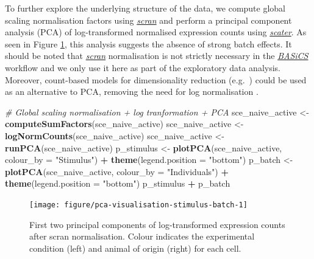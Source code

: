 \documentclass[9pt,a4paper,]{extarticle}
\newenvironment{Shaded}{\begin{snugshade}}{\end{snugshade}}
\newcommand{\CommentTok}[1]{\textcolor[rgb]{0.56,0.35,0.01}{\textit{#1}}}
\newcommand{\DataTypeTok}[1]{\textcolor[rgb]{0.13,0.29,0.53}{#1}}
\newcommand{\KeywordTok}[1]{\textcolor[rgb]{0.13,0.29,0.53}{\textbf{#1}}}
\newcommand{\NormalTok}[1]{#1}
\newcommand{\OperatorTok}[1]{\textcolor[rgb]{0.81,0.36,0.00}{\textbf{#1}}}
\newcommand{\StringTok}[1]{\textcolor[rgb]{0.31,0.60,0.02}{#1}}
\begin{document}
To further explore the underlying structure of the data, we compute global
scaling normalisation factors using \emph{\href{https://bioconductor.org/packages/3.11/scran}{scran}} and perform a
principal component analysis (PCA) of log-transformed normalised expression
counts using \emph{\href{https://bioconductor.org/packages/3.11/scater}{scater}}.
As seen in Figure \ref{fig:pca-visualisation-stimulus-batch}, this analysis
suggests the absence of strong batch effects.
It should be noted that \emph{\href{https://bioconductor.org/packages/3.11/scran}{scran}} normalisation
is not strictly necessary in the \emph{\href{https://bioconductor.org/packages/3.11/BASiCS}{BASiCS}} workflow and we only
use it here as part of the exploratory data analysis.
Moreover, count-based models for dimensionality reduction (e.g.~\citep{Townes2019, Lopez2018}) could be used as an alternative to PCA,
removing the need for log normalisation .

\begin{Shaded}
\begin{Highlighting}[]
\CommentTok{# Global scaling normalisation + log tranformation + PCA}
\NormalTok{sce_naive_active <-}\StringTok{ }\KeywordTok{computeSumFactors}\NormalTok{(sce_naive_active)}
\NormalTok{sce_naive_active <-}\StringTok{ }\KeywordTok{logNormCounts}\NormalTok{(sce_naive_active)}
\NormalTok{sce_naive_active <-}\StringTok{ }\KeywordTok{runPCA}\NormalTok{(sce_naive_active)}
\NormalTok{p_stimulus <-}\StringTok{ }\KeywordTok{plotPCA}\NormalTok{(sce_naive_active, }\DataTypeTok{colour_by =} \StringTok{"Stimulus"}\NormalTok{) }\OperatorTok{+}
\StringTok{  }\KeywordTok{theme}\NormalTok{(}\DataTypeTok{legend.position =} \StringTok{"bottom"}\NormalTok{)}
\NormalTok{p_batch <-}\StringTok{ }\KeywordTok{plotPCA}\NormalTok{(sce_naive_active, }\DataTypeTok{colour_by =} \StringTok{"Individuals"}\NormalTok{) }\OperatorTok{+}
\StringTok{  }\KeywordTok{theme}\NormalTok{(}\DataTypeTok{legend.position =} \StringTok{"bottom"}\NormalTok{)}
\NormalTok{p_stimulus }\OperatorTok{+}\StringTok{ }\NormalTok{p_batch}
\end{Highlighting}
\end{Shaded}

\begin{figure}

{\centering \texttt{[image: figure/pca-visualisation-stimulus-batch-1]} 

}

\caption{First two principal components of log-transformed expression counts after scran normalisation. Colour indicates the experimental condition (left) and animal of origin (right) for each cell.}\label{fig:pca-visualisation-stimulus-batch}
\end{figure}
\end{document}

